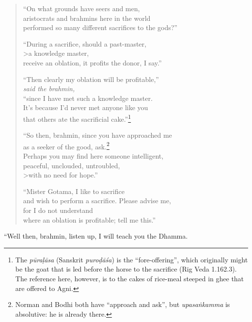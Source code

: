 \documentclass[12pt,openany]{book}%
\newcommand*{\scspeaker}[1]{\hspace{2em}\textit{#1}}
\begin{document}
\begin{verse}
“On what grounds have seers and men, \\
aristocrats and brahmins here in the world \\
performed so many different sacrifices to the gods?” 

“During a sacrifice, should a past-master, \\>a knowledge master, \\
receive an oblation, it profits the donor, I say.” 

“Then clearly my oblation will be profitable,” \\
\scspeaker{said the brahmin, }\\
“since I have met such a knowledge master. \\
It’s because I’d never met anyone like you \\
that others ate the sacrificial cake.”\footnote{The \textit{\textsanskrit{pūraḷāsa}} (Sanskrit \textit{\textsanskrit{puroḍāśa}}) is the “fore-offering”, which originally might be the goat that is led before the horse to the sacrifice (Rig Veda 1.162.3). The reference here, however, is to the cakes of rice-meal steeped in ghee that are offered to Agni. } 

“So then, brahmin, since you have approached me \\
as a seeker of the good, ask.\footnote{Norman and Bodhi both have “approach and ask”, but \textit{\textsanskrit{upasaṅkamma}} is absolutive: he is already there. } \\
Perhaps you may find here someone intelligent, \\
peaceful, unclouded, untroubled, \\>with no need for hope.” 

“Mister Gotama, I like to sacrifice \\
and wish to perform a sacrifice. Please advise me, \\
for I do not understand \\
where an oblation is profitable; tell me this.” 

%
\end{verse}

“Well then, brahmin, listen up, I will teach you the Dhamma. 
\end{document}
